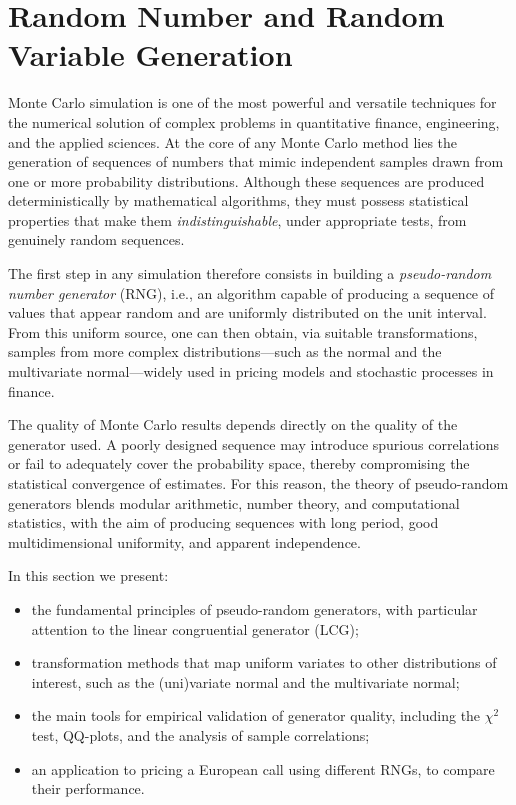 
\section{Random Number and Random Variable Generation} 

Monte Carlo simulation is one of the most powerful and versatile techniques for the numerical solution of complex problems in quantitative finance, engineering, and the applied sciences. 
At the core of any Monte Carlo method lies the generation of sequences of numbers that mimic independent samples drawn from one or more probability distributions. 
Although these sequences are produced deterministically by mathematical algorithms, they must possess statistical properties that make them \emph{indistinguishable}, under appropriate tests, from genuinely random sequences.

The first step in any simulation therefore consists in building a \emph{pseudo-random number generator} (RNG), i.e., an algorithm capable of producing a sequence of values that appear random and are uniformly distributed on the unit interval. 
From this uniform source, one can then obtain, via suitable transformations, samples from more complex distributions—such as the normal and the multivariate normal—widely used in pricing models and stochastic processes in finance.

The quality of Monte Carlo results depends directly on the quality of the generator used. 
A poorly designed sequence may introduce spurious correlations or fail to adequately cover the probability space, thereby compromising the statistical convergence of estimates. 
For this reason, the theory of pseudo-random generators blends modular arithmetic, number theory, and computational statistics, with the aim of producing sequences with long period, good multidimensional uniformity, and apparent independence.

In this section we present:
\begin{itemize}
    \item the fundamental principles of pseudo-random generators, with particular attention to the linear congruential generator (LCG);
    \item transformation methods that map uniform variates to other distributions of interest, such as the (uni)variate normal and the multivariate normal;
    \item the main tools for empirical validation of generator quality, including the $\chi^2$ test, QQ-plots, and the analysis of sample correlations;
    \item an application to pricing a European call using different RNGs, to compare their performance.
\end{itemize}

